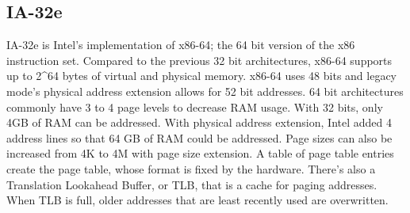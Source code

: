 \documentclass[letterpaper,10pt,titlepage]{article}
\begin{document}
\subsection*{IA-32e}

IA-32e is Intel's implementation of x86-64; the 64 bit version of the x86 instruction set. Compared to the previous 32 bit architectures, x86-64 supports up to 2\^{}64 bytes of virtual and physical memory. x86-64 uses 48 bits and legacy mode's physical address extension allows for 52 bit addresses. 64 bit architectures commonly have 3 to 4 page levels to decrease RAM usage. With 32 bits, only 4GB of RAM can be addressed. With physical address extension, Intel added 4 address lines so that 64 GB of RAM could be addressed. Page sizes can also be increased from 4K to 4M with page size extension. A table of page table entries create the page table, whose format is fixed by the hardware. There's also a Translation Lookahead Buffer, or TLB, that is a cache for paging addresses. When TLB is full, older addresses that are least recently used are overwritten.\cite{ia32e}



\end{document}
